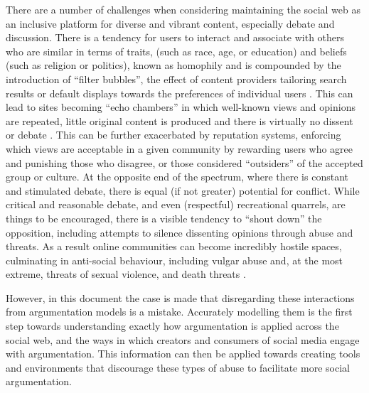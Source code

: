 There are a number of challenges when considering maintaining the social web as an inclusive platform for diverse and vibrant content, especially debate and discussion. There is a tendency for users to interact and associate with others who are similar in terms of traits, (such as race, age, or education) and beliefs (such as religion or politics), known as homophily \citep{sherchan2013} and is compounded by the introduction of ``filter bubbles'', the effect of content providers tailoring search results or default displays towards the preferences of individual users 
\citep{pariser2011}. This can lead to sites becoming ``echo chambers'' in which well-known views and opinions are repeated, little original content is produced and there is virtually no dissent or debate \citep{gilbert2009}. This can be further exacerbated by reputation systems, enforcing which views are acceptable in a given community by rewarding users who agree and punishing those who disagree, or those considered ``outsiders'' of the accepted group or culture. At the opposite end of the spectrum, where there is constant and stimulated debate, there is equal (if not greater) potential for conflict. While critical and reasonable debate, and even (respectful) recreational quarrels, are things to be encouraged, there is a visible tendency to ``shout down'' the opposition, including attempts to silence dissenting opinions through abuse and threats. As a result online communities can become incredibly hostile spaces, culminating in anti-social behaviour, including vulgar abuse and, at the most extreme, threats of sexual violence, and death threats \citep{willard2007, jane2014}. 

However, in this document the case is made that disregarding these interactions from argumentation models is a mistake. Accurately modelling them is the first step towards understanding exactly how argumentation is applied across the social web, and the ways in which creators and consumers of social media engage with argumentation. This information can then be applied towards creating tools and environments that discourage these types of abuse to facilitate more social argumentation.


